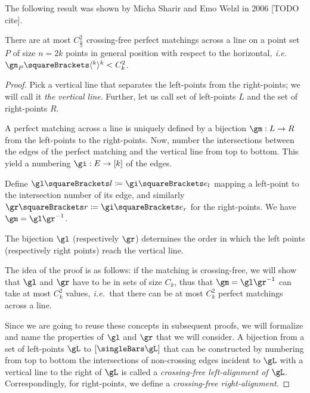 \documentclass[10pt, a4paper, twoside]{basestyle}
\newcommand{\idest}{\emph{, i.e.\ }}
\begin{document}
The following result was shown by Micha Sharir and Emo Welzl in 2006 [TODO cite].
\begin{theorem}
There are at most $C_{\frac n 2}^2$ crossing-free perfect matchings across a line on a point set $P$ of size
$n=2k$ points in general position with respect to the horizontal\idest
$\gn_P\of {\langle^k\rangle^k} < C_k^2$.
\begin{proof}
Pick a vertical line that separates the left-points from the right-points; we will call it \emph{the vertical line}.
Further, let us call set of left-points $L$ and the set of right-points $R$.

A perfect matching across a line is uniquely defined by a bijection $\FunctionSpec \gm L R$ from
the left-points to the right-points.
Now, number the intersections between the edges of the perfect matching and the vertical
line from top to bottom. This yield a numbering $\FunctionSpec \gi E {[k]}$ of the edges.

Define $\gl\of l \DefineAs \gi\of{e_l}$ mapping a left-point to the intersection number of its
edge, and similarly $\gr\of r \DefineAs \gi\of{e_r}$ for the right-points. We have $\gm = \gl \gr^{-1}$.

The bijection $\gl$ (respectively $\gr$) determines the order in which the left points (respectively right points)
reach the vertical line.

The idea of the proof is as follows: if the matching is crossing-free, we will show that
$\gl$ and $\gr$ have to be in sets of size $C_k$, thus that $\gm = \gl \gr^{-1}$ can take at most
$C_k^2$ values\idest that there can be at most $C_k^2$ perfect matchings across a line.

Since we are going to reuse these concepts in subsequent proofs, we will formalize and name the properties of
$\gl$ and $\gr$ that we will consider. A bijection from a set of left-points $\gL$ to $[\Cardinality \gL]$
that can be constructed by numbering from top to bottom the intersections of non-crossing edges incident to $\gL$ with a
vertical line to the right of $\gL$ is called a \emph{crossing-free left-alignment of $\gL$}. Correspondingly, for
right-points, we define a \emph{crossing-free right-alignment}.
\end{proof}
\end{theorem}
\end{document}
